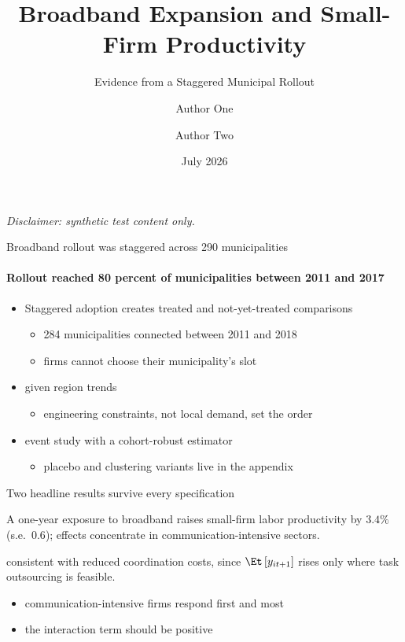 \documentclass[11pt, aspectratio=169]{beamer}
\title[Broadband and productivity]{Broadband Expansion and Small-Firm Productivity}
\subtitle{Evidence from a Staggered Municipal Rollout}
\author[One \& Two]{Author One \and Author Two}
\date[July 2026]{July 2026}
\begin{document}
\begin{frame}[plain]
  \titlepage
  \vfill\centering\scriptsize\textit{Disclaimer: synthetic test content only.}
\end{frame}
\addtocounter{framenumber}{-1}

\begin{frame}{Broadband rollout was staggered across 290 municipalities}
  \framesubtitle{Rollout reached 80 percent of municipalities between 2011 and 2017}
  \begin{itemize}
    \item Staggered adoption creates treated and not-yet-treated comparisons
      \begin{itemize}
        \item 284 municipalities connected between 2011 and 2018
        \item firms cannot choose their municipality's slot
      \end{itemize}
    \item {} given region trends 
      \begin{itemize}
        \item engineering constraints, not local demand, set the order
      \end{itemize}
    \item {} event study with a cohort-robust estimator
      \begin{itemize}
        \item placebo and clustering variants live in the appendix
      \end{itemize}
  \end{itemize}
\end{frame}

\begin{frame}{Two headline results survive every specification}
  \begin{ResultBox}
    A one-year exposure to broadband raises small-firm labor productivity by
    $3.4\%$ (s.e.\ $0.6$); effects concentrate in communication-intensive sectors.
  \end{ResultBox}
  \medskip
   consistent with reduced coordination costs, since
  $\Et\,[y_{it+1}] $ rises only where task outsourcing is feasible.
  \begin{itemize}
    \item communication-intensive firms respond first and most
    \item {} the interaction term should be positive
  \end{itemize}
\end{frame}
\end{document}
